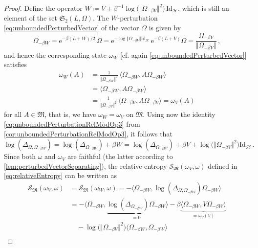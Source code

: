 \documentclass[a4paper, twoside, 11pt, reqno]{amsart}
\theoremstyle{definition}
\theoremstyle{plain}
\renewcommand{\Delta}{\varDelta}
\renewcommand{\Omega}{\varOmega}
\newcommand{\MH}{\mathcal{H}}
\newcommand{\MS}{\mathcal{S}}
\newcommand{\MFM}{\mathfrak{M}}
\newcommand{\MFS}{\mathfrak{S}}
\newcommand{\ee}{\mathrm{e}}
\newcommand{\id}{\mathrm{Id}}
\newcommand{\1}{\mathbf{1}}
\newcommand{\norm}[2][]{#1\Vert{#2}#1\Vert}
\newcommand{\braket}[2][]{#1\langle{#2}#1\rangle}
\newcommand{\ce}{\coloneqq}
\newcommand{\inv}[1]{#1^{-1}}
\begin{document}
\begin{proof}   
    Define the operator $W \ce V + \inv{\beta} \log\bigl(\norm{\Omega_{- \beta V}}^2\bigr) \, \id_\MH$, which is still an element of the set $\MFS_2(L, \Omega)$. The $W$-perturbation \eqref{eq:unboundedPerturbedVector} of the vector $\Omega$ is given by
    \begin{equation*}
        \Omega_{-\beta W} = \ee^{- \beta (L + W) / 2} \, \Omega = \ee^{- \log \norm{\Omega_{- \beta V}} \id_\MH} \, \ee^{- \beta (L + V)} \Omega = \frac{\Omega_{- \beta V}}{\norm{\Omega_{- \beta V}}} \, ,
    \end{equation*}
    and hence the corresponding state $\omega_W$ [cf. again \cref{eq:unboundedPerturbedVector}] satisfies
    \begin{align*}
        \omega_W (A) &= \frac{1}{\norm{\Omega_{- \beta W}}^2} \, \braket{\Omega_{- \beta W}, A \Omega_{- \beta W}} \\[4pt]
        &= \braket{\Omega_{- \beta W}, A \Omega_{- \beta W}} \\
        &= \frac{1}{\norm{\Omega_{- \beta V}}^2} \, \braket{\Omega_{- \beta V}, A \Omega_{- \beta V}} = \omega_V (A)
    \end{align*}
    for all $A \in \MFM$, that is, we have $\omega_W = \omega_V$ on $\MFM$. Using now the identity \eqref{eq:unboundedPerturbationRelModOp3} from \cref{cor:unboundedPerturbationRelModOp3}, it follows that
    \begin{equation*}
        \log (\Delta_{\Omega, \Omega_{- \beta W}}) = \log(\Delta_{\Omega_{- \beta W}}) + \beta W = \log(\Delta_{\Omega_{- \beta W}}) + \beta V + \log\bigl(\norm{\Omega_{- \beta V}}^2\bigr) \id_\MH \, .
    \end{equation*}
    Since both $\omega$ and $\omega_V$ are faithful (the latter according to \cref{lem:perturbedVectorSeparating}), the relative entropy $\MS_\MFM (\omega_V, \omega)$ defined in \cref{eq:relativeEntropy} can be written as
    \begin{align*}
        \MS_\MFM (\omega_V, \omega) &= \MS_\MFM (\omega_W, \omega) = - \braket[\big]{\Omega_{- \beta W}, \log (\Delta_{\Omega, \Omega_{- \beta W}}) \Omega_{- \beta W}} \\[4pt]
        &= - \braket[\big]{\Omega_{- \beta W}, \underbrace{\log(\Delta_{\Omega_{- \beta W}}) \Omega_{- \beta W}}_{=0}} - \beta \underbrace{\braket[\big]{\Omega_{- \beta W}, V \Omega_{- \beta W}}}_{= \omega_V(V)} \\[-2pt]
            &\quad - \log \bigl(\norm{\Omega_{- \beta V}}^2\bigr) \braket[\big]{\Omega_{- \beta W}, \Omega_{- \beta W}} \\[4pt]

\end{align*}
\end{proof}
\end{document}

